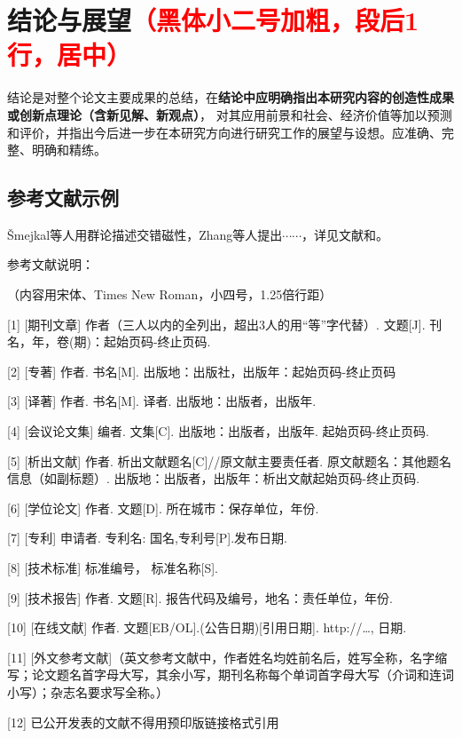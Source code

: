 \chapter[结论与展望]{结论与展望{\song\xiaosi \textcolor{red}{（黑体小二号加粗，段后1行，居中）}}}

结论是对整个论文主要成果的总结，在\textbf{结论中应明确指出本研究内容的创造性成果或创新点理论（含新见解、新观点）}，
对其应用前景和社会、经济价值等加以预测和评价，并指出今后进一步在本研究方向进行研究工作的展望与设想。应准确、完整、明确和精练。

\section{参考文献示例}
\v{S}mejkal等人用群论描述交错磁性\cite{altermagnetic1,altermagnetic2}，Zhang等人提出$\cdots\cdots$，详见文献和。

{\color{red}

    参考文献说明：
    
    （内容用宋体、Times New Roman，小四号，1.25倍行距）

[1]	[期刊文章] 作者（三人以内的全列出，超出3人的用“等”字代替）. 文题[J]. 刊名，年，卷(期)：起始页码-终止页码.

[2]	[专著] 作者. 书名[M]. 出版地：出版社，出版年：起始页码-终止页码

[3]	[译著] 作者. 书名[M]. 译者. 出版地：出版者，出版年.

[4]	[会议论文集] 编者. 文集[C]. 出版地：出版者，出版年. 起始页码-终止页码.

[5]	[析出文献] 作者. 析出文献题名[C]//原文献主要责任者. 原文献题名：其他题名信息（如副标题）. 出版地：出版者，出版年：析出文献起始页码-终止页码.

[6]	[学位论文] 作者. 文题[D]. 所在城市：保存单位，年份.

[7]	[专利] 申请者. 专利名: 国名,专利号[P].发布日期. 

[8]	[技术标准] 标准编号， 标准名称[S].

[9]	[技术报告] 作者. 文题[R]. 报告代码及编号，地名：责任单位，年份. 

[10]	[在线文献] 作者. 文题[EB/OL].(公告日期)[引用日期]. http://…, 日期.

[11]	[外文参考文献]（英文参考文献中，作者姓名均姓前名后，姓写全称，名字缩写；论文题名首字母大写，其余小写，期刊名称每个单词首字母大写（介词和连词小写）；杂志名要求写全称。）

[12]	已公开发表的文献不得用预印版链接格式引用
}
